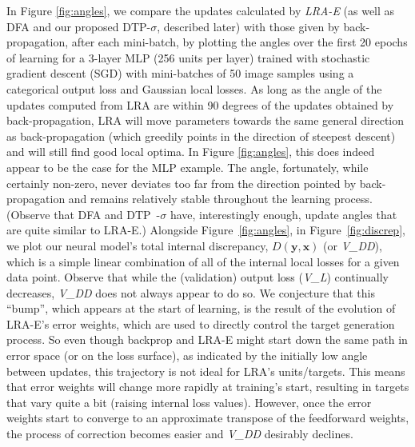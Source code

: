 \documentclass[letterpaper]{article} %
\begin{document}
In Figure \ref{fig:angles}, we compare the updates calculated by \emph{LRA-E} (as well as DFA and our proposed DTP-$\sigma$, described later) with those given by back-propagation, after each mini-batch, by plotting the angles over the first 20 epochs of learning for a 3-layer MLP (256 units per layer) trained with stochastic gradient descent (SGD) with mini-batches of 50 image samples using a categorical output loss and Gaussian local losses.
As long as the angle of the updates computed from LRA are within 90 degrees of the updates obtained by back-propagation, LRA will move parameters towards the same general direction as back-propagation (which greedily points in the direction of steepest descent) and will still find good local optima. In Figure \ref{fig:angles}, this does indeed appear to be the case for the MLP example. The angle, fortunately, while certainly non-zero, never deviates too far from the direction pointed by back-propagation and remains relatively stable throughout the learning process. (Observe that DFA and DTP~-$\sigma$ have, interestingly enough, update angles that are quite similar to LRA-E.)
Alongside Figure~\ref{fig:angles}, in Figure~\ref{fig:discrep}, we plot our neural model's total internal discrepancy, $D(\mathbf{y},\mathbf{x})$ (or \emph{V\_DD}), which is a simple linear combination of all of the internal local losses for a given data point.
Observe that while the (validation) output loss (\emph{V\_L}) continually decreases, \emph{V\_DD} does not always appear to do so.
We conjecture that this ``bump'', which appears at the start of learning, is the result of the evolution of LRA-E's error weights, which are used to directly control the target generation process. So even though backprop and LRA-E might start down the same path in error space (or on the loss surface), as indicated by the initially low angle between updates, this trajectory is not ideal for LRA's units/targets. This means that error weights will change more rapidly at training's start, resulting in targets that vary quite a bit (raising internal loss values). However, once the error weights start to converge to an approximate transpose of the feedforward weights, the process of correction becomes easier and \emph{V\_DD} desirably declines.
\end{document}
